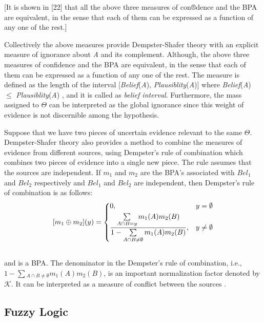 \documentclass[11pt]{article}
\begin{document}
[It is shown in [22] that all the above three measures of con®dence and the BPA
are equivalent, in the sense that each of them can be expressed as a function of
any one of the rest.]

Collectively the above measures provide Dempster-Shafer theory with an explicit
measure of ignorance about \textit{A} and its complement. Although, the above
three measures of confidence and the BPA are equivalent, in the sense that each
of them can be expressed as a function of any one of the rest. The measure
is defined as the length of the interval [\textit{Belief}(\textit{A}),
\textit{Plausiblity}(\textit{A})] where \textit{Belief}(\textit{A}) $\leqslant$
\textit{Plausiblity}(\textit{A}) \cite{yager:dst-combination-rules}, and it is
called as \textit{belief interval}. Furthermore, the mass assigned to $\Theta$
can be interpreted as the global ignorance since this weight of evidence is not
discernible among the hypothesis.

Suppose that we have two pieces of uncertain evidence relevant to the same
$\Theta$. Dempster-Shafer theory also provides a method to combine the measures
of evidence from different sources, using Dempster's rule of combination which
combines two pieces of evidence into a single new piece. The rule assumes that
the sources are independent. If $m_1$ and $m_2$ are the BPA's associated with
$Bel_1$ and $Bel_2$ respectively and $Bel_1$ and $Bel_2$ are independent, then
Dempster's rule of combination is as follows:\\

\[
	[m_1 \oplus m_2](y) = 
    \begin{dcases}
      0, & y = \emptyset \\
      \frac{\sum\limits_{A \cap B = y}m_1(A)m_2(B)}{1-\sum\limits_{A
      \cap B \neq \emptyset}m_1(A)m_2(B)}, & y
      \neq
      \emptyset
	\end{dcases}
\]\\

\noindent and is a BPA. The denominator in the Dempster's rule of combination,
i.e., $1-\sum\limits{_{A \cap B \neq \emptyset}}m_1(A)m_2(B)$, is an important
normalization factor denoted by $\mathcal{K}$. It can be interpreted as a
measure of conflict between the sources
\cite{srivastava:evidential-reasoning-uncertainty}.

\subsection{Fuzzy Logic}
\end{document}
